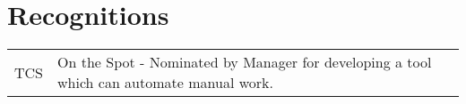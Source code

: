 \documentclass[]{article}
\newcommand{\sectionsep}[0]{\vspace{8pt}}
\begin{document}
\begin{minipage}[t]{0.66\textwidth}

  \section{Recognitions}
  \begin{tabulary}{\linewidth}{LLL}
  TCS & On the Spot - Nominated by Manager for developing a tool which can automate manual work. \\
  \end{tabulary}
  \sectionsep
 
\end{minipage}
\end{document}
